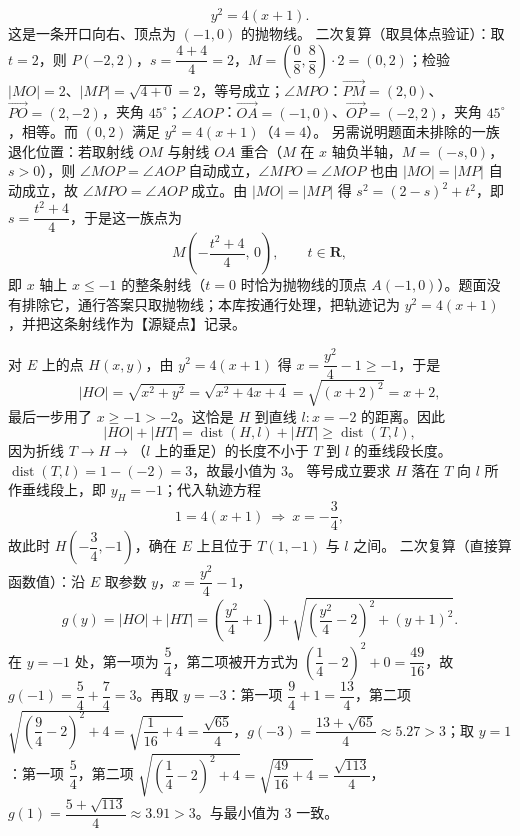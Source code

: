 \begin{answer}
\[y^2=4(x+1).
\]
这是一条开口向右、顶点为 $(-1,0)$ 的抛物线。
二次复算（取具体点验证）：取 $t=2$，则 $P(-2,2)$，$s=\dfrac{4+4}{4}=2$，$M=\left(\dfrac{0}{8},\dfrac{8}{8}\right)\cdot2=(0,2)$；检验 $|MO|=2$、$|MP|=\sqrt{4+0}=2$，等号成立；$\angle MPO$：$\overrightarrow{PM}=(2,0)$、$\overrightarrow{PO}=(2,-2)$，夹角 $45^\circ$；$\angle AOP$：$\overrightarrow{OA}=(-1,0)$、$\overrightarrow{OP}=(-2,2)$，夹角 $45^\circ$，相等。而 $(0,2)$ 满足 $y^2=4(x+1)$（$4=4$）。
另需说明题面未排除的一族退化位置：若取射线 $OM$ 与射线 $OA$ 重合（$M$ 在 $x$ 轴负半轴，$M=(-s,0)$，$s>0$），则 $\angle MOP=\angle AOP$ 自动成立，$\angle MPO=\angle MOP$ 也由 $|MO|=|MP|$ 自动成立，故 $\angle MPO=\angle AOP$ 成立。由 $|MO|=|MP|$ 得 $s^2=(2-s)^2+t^2$，即 $s=\dfrac{t^2+4}{4}$，于是这一族点为
\nopagebreak[4]
\[
M\left(-\frac{t^2+4}{4},\,0\right),\qquad t\in\mathbf R,
\]
即 $x$ 轴上 $x\leqslant-1$ 的整条射线（$t=0$ 时恰为抛物线的顶点 $A(-1,0)$）。题面没有排除它，通行答案只取抛物线；本库按通行处理，把轨迹记为 $y^2=4(x+1)$，并把这条射线作为【源疑点】记录。

对 $E$ 上的点 $H(x,y)$，由 $y^2=4(x+1)$ 得 $x=\dfrac{y^2}{4}-1\geqslant-1$，于是
\nopagebreak[4]
\[
|HO|=\sqrt{x^2+y^2}=\sqrt{x^2+4x+4}=\sqrt{(x+2)^2}=x+2,
\]
最后一步用了 $x\geqslant-1>-2$。这恰是 $H$ 到直线 $l:x=-2$ 的距离。因此
\nopagebreak[4]
\[
|HO|+|HT|=\operatorname{dist}(H,l)+|HT|\geqslant\operatorname{dist}(T,l),
\]
因为折线 $T\to H\to$（$l$ 上的垂足）的长度不小于 $T$ 到 $l$ 的垂线段长度。$\operatorname{dist}(T,l)=1-(-2)=3$，故最小值为 $3$。
等号成立要求 $H$ 落在 $T$ 向 $l$ 所作垂线段上，即 $y_H=-1$；代入轨迹方程
\nopagebreak[4]
\[
1=4(x+1)\ \Longrightarrow\ x=-\frac34,
\]
故此时 $H\left(-\dfrac34,-1\right)$，确在 $E$ 上且位于 $T(1,-1)$ 与 $l$ 之间。
二次复算（直接算函数值）：沿 $E$ 取参数 $y$，$x=\dfrac{y^2}{4}-1$，
\nopagebreak[4]
\[
g(y)=|HO|+|HT|=\left(\frac{y^2}{4}+1\right)+\sqrt{\left(\frac{y^2}{4}-2\right)^2+(y+1)^2}.
\]
在 $y=-1$ 处，第一项为 $\dfrac54$，第二项被开方式为 $\left(\dfrac14-2\right)^2+0=\dfrac{49}{16}$，故 $g(-1)=\dfrac54+\dfrac74=3$。再取 $y=-3$：第一项 $\dfrac94+1=\dfrac{13}{4}$，第二项 $\sqrt{\left(\dfrac94-2\right)^2+4}=\sqrt{\dfrac1{16}+4}=\dfrac{\sqrt{65}}{4}$，$g(-3)=\dfrac{13+\sqrt{65}}{4}\approx5.27>3$；取 $y=1$：第一项 $\dfrac54$，第二项 $\sqrt{\left(\dfrac14-2\right)^2+4}=\sqrt{\dfrac{49}{16}+4}=\dfrac{\sqrt{113}}{4}$，$g(1)=\dfrac{5+\sqrt{113}}{4}\approx3.91>3$。与最小值为 $3$ 一致。


\end{answer}

